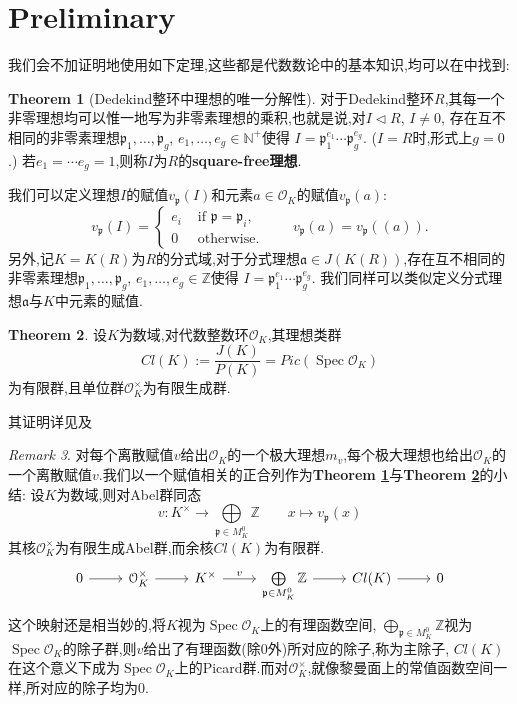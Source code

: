 \documentclass[12pt,A4paper,oneside,reqno]{amsart}
\numberwithin{equation}{section}
\theoremstyle{definition}
\newtheorem{theorem}{Theorem}[section]
\theoremstyle{plain}
\theoremstyle{plain}
\numberwithin{equation}{section}
\theoremstyle{remark}
\newtheorem{remark}[theorem]{Remark}
\newcommand{\Spec}{\operatorname{Spec}}
\begin{document}
\section{Preliminary}
我们会不加证明地使用如下定理,这些都是代数数论中的基本知识,均可以在\cite{冯克勤2000代数数论}中找到:
\begin{theorem}[Dedekind整环中理想的唯一分解性]\label{thm:idealinDede}
	对于Dedekind整环$R$,其每一个非零理想均可以惟一地写为非零素理想的乘积,也就是说,对$I \vartriangleleft R$, $I \neq 0$, 存在互不相同的非零素理想$\mathfrak{p}_1, \ldots ,\mathfrak{p}_g$, $e_1,\ldots ,e_g \in \mathbb{N}^+$使得
	$I = \mathfrak{p}_1^{e_1}\cdots\mathfrak{p}_g^{e_g}$.
	($I=R$时,形式上$g=0$.)	若$e_1=\cdots e_g=1$,则称$I$为$R$的\textbf{square-free理想}.
	
	我们可以定义理想$I$的赋值$v_{\mathfrak{p}}(I)$和元素$a \in \mathcal{O}_K$的赋值$v_{\mathfrak{p}}(a)$:
	$$v_{\mathfrak{p}}(I)=\begin{cases}
	e_i & \text{ if }\mathfrak{p} = \mathfrak{p}_i,\\
	0 & \text{ otherwise.}
	\end{cases} \qquad v_{\mathfrak{p}}(a)=v_{\mathfrak{p}}((a)).$$
	另外,记$K=K(R)$为$R$的分式域,对于分式理想$\mathfrak{a} \in J(K(R))$,存在互不相同的非零素理想$\mathfrak{p}_1, \ldots ,\mathfrak{p}_g$, $e_1,\ldots ,e_g \in \mathbb{Z}$使得
	$I = \mathfrak{p}_1^{e_1}\cdots\mathfrak{p}_g^{e_g}$.
	我们同样可以类似定义分式理想$\mathfrak{a}$与$K$中元素的赋值.
\end{theorem}
\begin{theorem}\label{thm:idealclass}
	设$K$为数域,对代数整数环$\mathcal{O}_K$,其理想类群
	$$Cl(K):=\frac{J(K)}{P(K)}=Pic(\Spec \mathcal{O}_K)$$
	为有限群,且单位群$\mathcal{O}_K^{\times}$为有限生成群.
	
	其证明详见\cite[1, p105, 定理3.4]{冯克勤2000代数数论}及\cite[1, p133, 定理3.6]{冯克勤2000代数数论}
\end{theorem}
\begin{remark}
	对每个离散赋值$v$给出$\mathcal{O}_K$的一个极大理想$m_v$,每个极大理想也给出$\mathcal{O}_K$的一个离散赋值$v$.我们以一个赋值相关的正合列作为\textbf{Theorem \ref{thm:idealinDede}}与\textbf{Theorem \ref{thm:idealclass}}的小结:
	设$K$为数域,则对Abel群同态
	$$v: K^{\times} \longrightarrow \bigoplus\limits_{\mathfrak{p} \in M_K^{0}}\mathbb{Z} \qquad x \longmapsto v_{\mathfrak{p}}(x)$$
	其核$\mathcal{O}_K^{\times}$为有限生成Abel群,而余核$Cl(K)$为有限群.
	\begin{equation}\label{eq:exactAN}
	\begin{tikzcd}
	0 \arrow[r] & \mathcal{O}_K^{\times} \arrow[r] & K^{\times} \arrow[r, "v"] & \bigoplus\limits_{\mathfrak{p} \in M_K^{0}}\mathbb{Z} \arrow[r] & Cl(K) \arrow[r] & 0
	\end{tikzcd}	
	\end{equation}
	这个映射还是相当妙的,将$K$视为$\Spec \mathcal{O}_K$上的有理函数空间, $\bigoplus_{\mathfrak{p} \in M_K^{0}}\mathbb{Z}$视为$\Spec \mathcal{O}_K$的除子群,则$v$给出了有理函数(除$0$外)所对应的除子,称为主除子, $Cl(K)$在这个意义下成为$\Spec \mathcal{O}_K$上的Picard群.而对$\mathcal{O}_K^{\times}$,就像黎曼面上的常值函数空间一样,所对应的除子均为$0$.
\end{remark}
\end{document}
